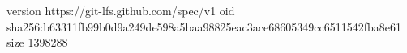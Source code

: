 version https://git-lfs.github.com/spec/v1
oid sha256:b63311fb99b0d9a249de598a5baa98825eac3ace68605349cc6511542fba8e61
size 1398288
